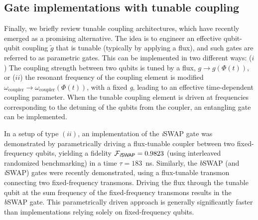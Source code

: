 \documentclass[aip,apr,twocolumn,showpacs,superscriptaddress,groupedaddress,nofootinbib,reprint]{revtex4-1}  %
\newcommand{\iSWAP}{\emph{i}\textsf{SWAP}}
\newcommand{\bSWAP}{\emph{b}\textsf{SWAP}}
\begin{document}
\subsection{\label{sec:TunableCouplingimplementations}Gate implementations with tunable coupling}
Finally, we briefly review tunable coupling architectures, which have recently emerged as a promising alternative. The idea is to engineer an effective qubit-qubit coupling $\widetilde g$ that is tunable (typically by applying a flux), and such gates are referred to as parametric gates. This can be implemented in two different ways: ($i$) The coupling strength between two qubits is tuned by a flux, $g\rightarrow g(\Phi(t))$\cite{Bertet2006,VanderPloeg2007,Chen2016,Wulschner2016,Allman2014}, or ($ii$) the resonant frequency of the coupling element is modified $\omega_\text{coupler} \rightarrow\omega_\text{coupler}(\Phi(t))$\cite{Niskanen2007,Wallquist2006,Harrabi2009,Wang2011,Whittaker2014,Andersen2015,Yan2018}, with a fixed \emph{g}, leading to an effective time-dependent coupling parameter. When the tunable coupling element is driven at frequencies corresponding to the detuning of the qubits from the coupler, an entangling gate can be implemented.

In a setup of type $(ii)$, an implementation of the \iSWAP{} gate was demonstrated by parametrically driving a flux-tunable coupler between two fixed-frequency qubits\cite{McKay2016}, yielding a fidelity $\mathcal F_{\iSWAP{}} = 0.9823$ (using interleaved randomized benchmarking) in a time $\tau = 183$~ns. Similarly, the \bSWAP{} (and \iSWAP{}) gates were recently demonstrated, using a flux-tunable transmon connecting two fixed-frequency transmons. Driving the flux through the tunable qubit at the sum frequency of the fixed-frequency transmons results in the \bSWAP{}\cite{Roth2017} gate. This parametrically driven approach is generally significantly faster than implementations relying solely on fixed-frequency qubits.
\end{document}
